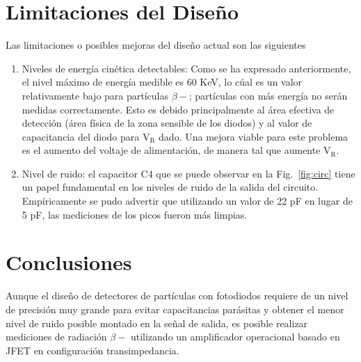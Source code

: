 \documentclass[a4paper,conference]{IEEEtran}
\begin{document}
\section{Limitaciones del Diseño}
    Las limitaciones o posibles mejoras del diseño actual son las siguientes
    \begin{enumerate}
        \item Niveles de energía cinética detectables: Como se ha expresado
            anteriormente, el nivel máximo de energía medible es 60 KeV, lo cúal
            es un valor relativamente bajo para partículas $\beta-$; partículas
            con más energía no serán medidas correctamente. Esto es debido
            principalmente al área efectiva de detección (área física de la zona
            sensible de los diodos) y al valor de capacitancia del diodo para
            $\mathrm{V_{R}}$ dado. Una mejora viable para este problema es el
            aumento del voltaje de alimentación, de manera tal que aumente
            $\mathrm{V_{R}}$.

        \item Nivel de ruido: el capacitor C4 que se puede observar en la
            Fig.~\ref{fig:circ} tiene un papel fundamental en los niveles de
            ruido de la salida del circuito. Empíricamente se pudo advertir
            que utilizando un valor de 22 pF en lugar de 5 pF, las mediciones  
            de los picos fueron más limpias.
    \end{enumerate}

\section{Conclusiones}
    Aunque el diseño de detectores de partículas con fotodiodos requiere de un nivel de
    precisión muy grande para evitar capacitancias parásitas y obtener el menor
    nivel de ruido posible montado en la señal de salida, es posible realizar
    mediciones de radiación $\beta-$ utilizando un amplificador operacional
    basado en JFET en configuración transimpedancia. 


\nocite{*}
\end{document}
